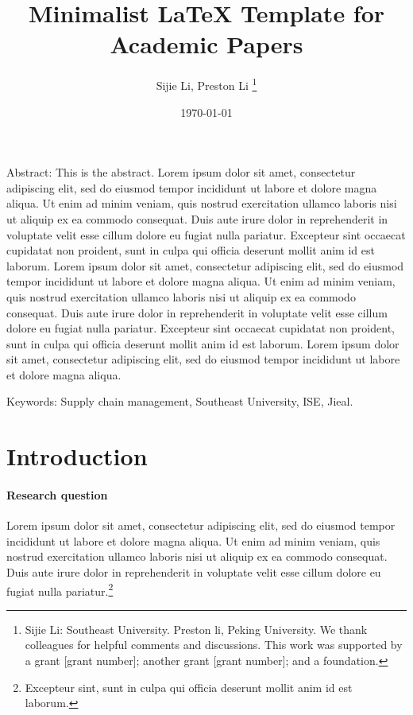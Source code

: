 \documentclass[letterpaper,12pt,leqno]{article}
\begin{document}
\title{Minimalist LaTeX Template for Academic Papers}
\author{Sijie Li, Preston Li
\thanks{Sijie Li: Southeast University. Preston li, Peking University. We thank colleagues for helpful comments and discussions. This work was supported by a grant [grant number]; another grant [grant number]; and a foundation.}}
\date{\today}

\begin{titlepage}

\maketitle

Abstract: This is the abstract. Lorem ipsum dolor sit amet, consectetur adipiscing elit, sed do eiusmod tempor incididunt ut labore et dolore magna aliqua. Ut enim ad minim veniam, quis nostrud exercitation ullamco laboris nisi ut aliquip ex ea commodo consequat. Duis aute irure dolor in reprehenderit in voluptate velit esse cillum dolore eu fugiat nulla pariatur. Excepteur sint occaecat cupidatat non proident, sunt in culpa qui officia deserunt mollit anim id est laborum. Lorem ipsum dolor sit amet, consectetur adipiscing elit, sed do eiusmod tempor incididunt ut labore et dolore magna aliqua. Ut enim ad minim veniam, quis nostrud exercitation ullamco laboris nisi ut aliquip ex ea commodo consequat. Duis aute irure dolor in reprehenderit in voluptate velit esse cillum dolore eu fugiat nulla pariatur. Excepteur sint occaecat cupidatat non proident, sunt in culpa qui officia deserunt mollit anim id est laborum. Lorem ipsum dolor sit amet, consectetur adipiscing elit, sed do eiusmod tempor incididunt ut labore et dolore magna aliqua.
\vskip 5pt

Keywords: Supply chain management, Southeast University, ISE, Jieal.

\end{titlepage}

\section{Introduction}\label{s:introduction}
 
\paragraph{Research question} Lorem ipsum dolor sit amet, consectetur adipiscing elit, sed do eiusmod tempor incididunt ut labore et dolore magna aliqua. Ut enim ad minim veniam, quis nostrud exercitation ullamco laboris nisi ut aliquip ex ea commodo consequat. Duis aute irure dolor in reprehenderit in voluptate velit esse cillum dolore eu fugiat nulla pariatur.\footnote{Excepteur sint, sunt in culpa qui officia deserunt mollit anim id est laborum.}
\end{document}
